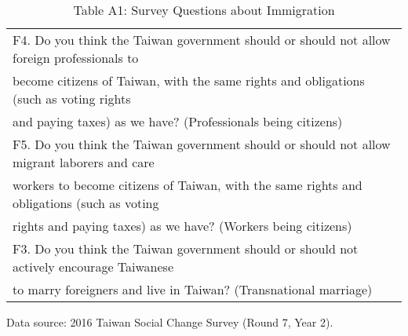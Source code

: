 \documentclass[12pt]{article}
\begin{document}
\begin{table}[ht!]
\begin{center}
  \begin{threeparttable}
\caption*{Table A1: Survey Questions about Immigration}
\begin{tabular}{l} 
\toprule
\midrule
F4. Do you think the Taiwan government should or should not allow foreign professionals to \\ 
\qquad become citizens of Taiwan, with the same rights and obligations (such as voting rights \\ 
\qquad and paying taxes) as we have? (Professionals being citizens)    \\
F5. Do you think the Taiwan government should or should not allow migrant laborers and care \\ 
\qquad workers to become citizens of Taiwan, with the same rights and obligations (such as voting \\ 
\qquad rights and paying taxes) as we have? (Workers being citizens)  \\
F3. Do you think the Taiwan government should or should not actively encourage Taiwanese  \\
\qquad to marry foreigners and live in Taiwan? (Transnational marriage)   \\
\toprule
\bottomrule
\end{tabular}
\begin{tablenotes}
  \item \footnotesize{Data source: 2016 Taiwan Social Change Survey (Round 7, Year 2).}
\end{tablenotes}
  \end{threeparttable}
\end{center}
\end{table} 


\clearpage


\newpage
\end{document}
